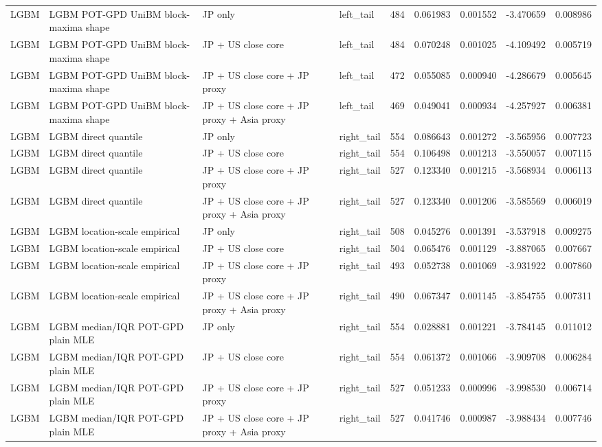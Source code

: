 \begin{tabular}{lll lrrrrr}
LGBM & LGBM POT-GPD UniBM block-maxima shape & JP only & left\_tail & 484 & 0.061983 & 0.001552 & -3.470659 & 0.008986 \\
LGBM & LGBM POT-GPD UniBM block-maxima shape & JP + US close core & left\_tail & 484 & 0.070248 & 0.001025 & -4.109492 & 0.005719 \\
LGBM & LGBM POT-GPD UniBM block-maxima shape & JP + US close core + JP proxy & left\_tail & 472 & 0.055085 & 0.000940 & -4.286679 & 0.005645 \\
LGBM & LGBM POT-GPD UniBM block-maxima shape & JP + US close core + JP proxy + Asia proxy & left\_tail & 469 & 0.049041 & 0.000934 & -4.257927 & 0.006381 \\
LGBM & LGBM direct quantile & JP only & right\_tail & 554 & 0.086643 & 0.001272 & -3.565956 & 0.007723 \\
LGBM & LGBM direct quantile & JP + US close core & right\_tail & 554 & 0.106498 & 0.001213 & -3.550057 & 0.007115 \\
LGBM & LGBM direct quantile & JP + US close core + JP proxy & right\_tail & 527 & 0.123340 & 0.001215 & -3.568934 & 0.006113 \\
LGBM & LGBM direct quantile & JP + US close core + JP proxy + Asia proxy & right\_tail & 527 & 0.123340 & 0.001206 & -3.585569 & 0.006019 \\
LGBM & LGBM location-scale empirical & JP only & right\_tail & 508 & 0.045276 & 0.001391 & -3.537918 & 0.009275 \\
LGBM & LGBM location-scale empirical & JP + US close core & right\_tail & 504 & 0.065476 & 0.001129 & -3.887065 & 0.007667 \\
LGBM & LGBM location-scale empirical & JP + US close core + JP proxy & right\_tail & 493 & 0.052738 & 0.001069 & -3.931922 & 0.007860 \\
LGBM & LGBM location-scale empirical & JP + US close core + JP proxy + Asia proxy & right\_tail & 490 & 0.067347 & 0.001145 & -3.854755 & 0.007311 \\
LGBM & LGBM median/IQR POT-GPD plain MLE & JP only & right\_tail & 554 & 0.028881 & 0.001221 & -3.784145 & 0.011012 \\
LGBM & LGBM median/IQR POT-GPD plain MLE & JP + US close core & right\_tail & 554 & 0.061372 & 0.001066 & -3.909708 & 0.006284 \\
LGBM & LGBM median/IQR POT-GPD plain MLE & JP + US close core + JP proxy & right\_tail & 527 & 0.051233 & 0.000996 & -3.998530 & 0.006714 \\
LGBM & LGBM median/IQR POT-GPD plain MLE & JP + US close core + JP proxy + Asia proxy & right\_tail & 527 & 0.041746 & 0.000987 & -3.988434 & 0.007746 \\

\end{tabular}
